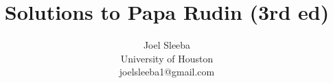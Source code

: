 \documentclass[12pt]{report}
\theoremstyle{plain} %
\theoremstyle{definition} %
\theoremstyle{remark} %
\begin{document}
\title{Solutions to Papa Rudin (3rd ed)}

\author{
  Joel Sleeba \\
  University of Houston \\
  joelsleeba1@gmail.com \\
}

\maketitle

 \setcounter{page}{2}
\tableofcontents
{} \setcounter{page}{1}



\printbibliography[heading=bibintoc]
\end{document}
